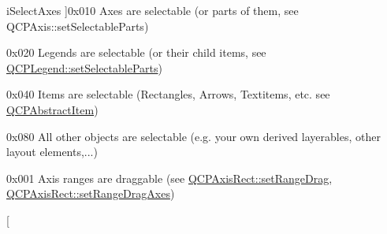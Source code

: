\begin{Desc}
\begin{description}
{i\+Select\+Axes\hypertarget{namespace_q_c_p_a2ad6bb6281c7c2d593d4277b44c2b037a7f49c26c8cf12373ac867d63737c62b9}{}\label{namespace_q_c_p_a2ad6bb6281c7c2d593d4277b44c2b037a7f49c26c8cf12373ac867d63737c62b9}
}]{\ttfamily 0x010} Axes are selectable (or parts of them, see Q\+C\+P\+Axis\+::set\+Selectable\+Parts) \item[{\em 
i\+Select\+Legend\hypertarget{namespace_q_c_p_a2ad6bb6281c7c2d593d4277b44c2b037a2b0800bffd93fc13090670eabf0fe1db}{}\label{namespace_q_c_p_a2ad6bb6281c7c2d593d4277b44c2b037a2b0800bffd93fc13090670eabf0fe1db}
}]{\ttfamily 0x020} Legends are selectable (or their child items, see \hyperlink{class_q_c_p_legend_a9ce60aa8bbd89f62ae4fa83ac6c60110}{Q\+C\+P\+Legend\+::set\+Selectable\+Parts}) \item[{\em 
i\+Select\+Items\hypertarget{namespace_q_c_p_a2ad6bb6281c7c2d593d4277b44c2b037a271679ebb13ab4a6b4c2c2d9459f1de8}{}\label{namespace_q_c_p_a2ad6bb6281c7c2d593d4277b44c2b037a271679ebb13ab4a6b4c2c2d9459f1de8}
}]{\ttfamily 0x040} Items are selectable (Rectangles, Arrows, Textitems, etc. see \hyperlink{class_q_c_p_abstract_item}{Q\+C\+P\+Abstract\+Item}) \item[{\em 
i\+Select\+Other\hypertarget{namespace_q_c_p_a2ad6bb6281c7c2d593d4277b44c2b037a2ba96f62595bc22603da0e575b589a83}{}\label{namespace_q_c_p_a2ad6bb6281c7c2d593d4277b44c2b037a2ba96f62595bc22603da0e575b589a83}
}]{\ttfamily 0x080} All other objects are selectable (e.\+g. your own derived layerables, other layout elements,...) \item[{\em 
i\+Range\+Drag\hypertarget{namespace_q_c_p_a2ad6bb6281c7c2d593d4277b44c2b037a15aab687b04f7ecf86506102b41b0900}{}\label{namespace_q_c_p_a2ad6bb6281c7c2d593d4277b44c2b037a15aab687b04f7ecf86506102b41b0900}
}]{\ttfamily 0x001} Axis ranges are draggable (see \hyperlink{class_q_c_p_axis_rect_ae6aef2f7211ba6097c925dcd26008418}{Q\+C\+P\+Axis\+Rect\+::set\+Range\+Drag}, \hyperlink{class_q_c_p_axis_rect_a648cce336bd99daac4a5ca3e5743775d}{Q\+C\+P\+Axis\+Rect\+::set\+Range\+Drag\+Axes}) \item[{\em 
}
\end{description}
\end{Desc}
